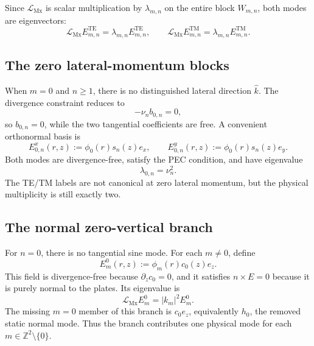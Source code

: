 \documentclass[11pt]{article}
\providecommand{\Z}{\mathbb{Z}}
\providecommand{\abs}[1]{\left\lvert #1\right\rvert}
\providecommand{\hzero}{h_0}
\providecommand{\LMx}{\mathcal L_{\mathrm{Mx}}}
\providecommand{\lambdamn}{\lambda_{m,n}}
\providecommand{\phim}{\phi_m}
\providecommand{\sn}{s_n}
\providecommand{\khat}{\widehat{k}}
\numberwithin{equation}{section}
\begin{document}
Since \(\LMx\) is scalar multiplication by \(\lambdamn\) on the entire block
\(W_{m,n}\), both modes are eigenvectors:
\begin{equation}
    \LMx E^{\mathrm{TE}}_{m,n}
    =
    \lambdamn E^{\mathrm{TE}}_{m,n},
    \qquad
    \LMx E^{\mathrm{TM}}_{m,n}
    =
    \lambdamn E^{\mathrm{TM}}_{m,n} .
    \label{eq:TE-TM-eigenvalues-section05}
\end{equation}

\subsection{The zero lateral-momentum blocks}
\label{subsec:zero-lateral-momentum-blocks-section05}

When \(m=0\) and \(n\geq1\), there is no distinguished lateral direction
\(\khat\).  The divergence constraint reduces to
\begin{equation}
    -\nu_n b_{0,n}=0,
\end{equation}
so \(b_{0,n}=0\), while the two tangential coefficients are free.  A convenient
orthonormal basis is
\begin{equation}
    E^{x}_{0,n}(r,z):=\phi_0(r)\sn(z)e_x,
    \qquad
    E^{y}_{0,n}(r,z):=\phi_0(r)\sn(z)e_y .
    \label{eq:m0-transverse-modes-section05}
\end{equation}
Both modes are divergence-free, satisfy the PEC condition, and have eigenvalue
\begin{equation}
    \lambda_{0,n}=\nu_n^2 .
    \label{eq:m0-eigenvalue-section05}
\end{equation}
The TE/TM labels are not canonical at zero lateral momentum, but the physical
multiplicity is still exactly two.

\subsection{The normal zero-vertical branch}
\label{subsec:normal-zero-vertical-branch-section05}

For \(n=0\), there is no tangential sine mode.  For each \(m\ne0\), define
\begin{equation}
    E^{0}_{m}(r,z):=\phim(r)c_0(z)e_z .
    \label{eq:normal-zero-branch-mode-section05}
\end{equation}
This field is divergence-free because \(\partial_z c_0=0\), and it satisfies
\(n\times E=0\) because it is purely normal to the plates.  Its eigenvalue is
\begin{equation}
    \LMx E^{0}_{m}=\abs{k_m}^2 E^{0}_{m} .
    \label{eq:normal-zero-branch-eigenvalue-section05}
\end{equation}
The missing \(m=0\) member of this branch is \(c_0 e_z\), equivalently
\(\hzero\), the removed static normal mode.  Thus the branch contributes one
physical mode for each \(m\in\Z^2\setminus\{0\}\).
\end{document}

